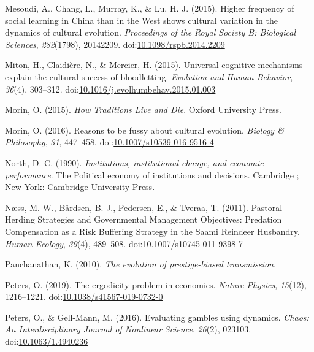 \documentclass[
  11pt,
]{article}
\begin{document}
\leavevmode\hypertarget{ref-mesoudiHigherFrequencySocial2015b}{}%
Mesoudi, A., Chang, L., Murray, K., \& Lu, H. J. (2015). Higher
frequency of social learning in China than in the West shows cultural
variation in the dynamics of cultural evolution. \emph{Proceedings of
the Royal Society B: Biological Sciences}, \emph{282}(1798), 20142209.
doi:\href{https://doi.org/10.1098/rspb.2014.2209}{10.1098/rspb.2014.2209}

\leavevmode\hypertarget{ref-mitonUniversalCognitiveMechanisms2015d}{}%
Miton, H., Claidière, N., \& Mercier, H. (2015). Universal cognitive
mechanisms explain the cultural success of bloodletting. \emph{Evolution
and Human Behavior}, \emph{36}(4), 303--312.
doi:\href{https://doi.org/10.1016/j.evolhumbehav.2015.01.003}{10.1016/j.evolhumbehav.2015.01.003}

\leavevmode\hypertarget{ref-morinHowTraditionsLive2015}{}%
Morin, O. (2015). \emph{How Traditions Live and Die}. Oxford University
Press.

\leavevmode\hypertarget{ref-morinReasonsBeFussy2016}{}%
Morin, O. (2016). Reasons to be fussy about cultural evolution.
\emph{Biology \& Philosophy}, \emph{31}, 447--458.
doi:\href{https://doi.org/10.1007/s10539-016-9516-4}{10.1007/s10539-016-9516-4}

\leavevmode\hypertarget{ref-northInstitutionsInstitutionalChange1990}{}%
North, D. C. (1990). \emph{Institutions, institutional change, and
economic performance}. The Political economy of institutions and
decisions. Cambridge ; New York: Cambridge University Press.

\leavevmode\hypertarget{ref-naessPastoralHerdingStrategies2011}{}%
Næss, M. W., Bårdsen, B.-J., Pedersen, E., \& Tveraa, T. (2011).
Pastoral Herding Strategies and Governmental Management Objectives:
Predation Compensation as a Risk Buffering Strategy in the Saami
Reindeer Husbandry. \emph{Human Ecology}, \emph{39}(4), 489--508.
doi:\href{https://doi.org/10.1007/s10745-011-9398-7}{10.1007/s10745-011-9398-7}

\leavevmode\hypertarget{ref-panchanathan2010evolution}{}%
Panchanathan, K. (2010). \emph{The evolution of prestige-biased
transmission}.

\leavevmode\hypertarget{ref-petersErgodicityProblemEconomics2019a}{}%
Peters, O. (2019). The ergodicity problem in economics. \emph{Nature
Physics}, \emph{15}(12), 1216--1221.
doi:\href{https://doi.org/10.1038/s41567-019-0732-0}{10.1038/s41567-019-0732-0}

\leavevmode\hypertarget{ref-petersEvaluatingGamblesUsing2016b}{}%
Peters, O., \& Gell-Mann, M. (2016). Evaluating gambles using dynamics.
\emph{Chaos: An Interdisciplinary Journal of Nonlinear Science},
\emph{26}(2), 023103.
doi:\href{https://doi.org/10.1063/1.4940236}{10.1063/1.4940236}
\end{document}
